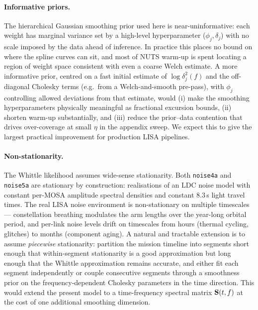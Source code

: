 \documentclass[%
	reprint,
	nofootinbib,
	amsmath,
	amssymb,
	aps,
]{revtex4-2}
\begin{document}
	\paragraph{Informative priors.}
	The hierarchical Gaussian smoothing prior used here is
	near-uninformative: each weight has marginal variance set by a
	high-level hyperparameter ($\phi_{j}, \delta_{j}$) with no scale
	imposed by the data ahead of inference. In practice this places no
	bound on where the spline curves can sit, and most of NUTS
	warm-up is spent locating a region of weight space consistent with
	even a coarse Welch estimate. A more informative prior, centred on
	a fast initial estimate of $\log\delta_{j}^{2}(f)$ and the
	off-diagonal Cholesky terms (e.g.\ from a Welch-and-smooth pre-pass),
	with $\phi_{j}$ controlling allowed deviations from that estimate,
	would (i) make the smoothing hyperparameters physically meaningful as
	fractional excursion bounds, (ii) shorten warm-up substantially, and
	(iii) reduce the prior--data contention that drives over-coverage at
	small $\eta$ in the appendix sweep. We expect this to give the largest
	practical improvement for production LISA pipelines.

	\paragraph{Non-stationarity.}
	The Whittle likelihood assumes wide-sense stationarity. Both
	\texttt{noise4a} and \texttt{noise5a} are stationary by
	construction: realisations of an LDC noise model with constant
	per-MOSA amplitude spectral densities and constant $8.3$\,s light
	travel times. The real LISA noise environment is non-stationary on
	multiple timescales --- constellation breathing modulates the arm
	lengths over the year-long orbital period, and per-link noise levels
	drift on timescales from hours (thermal cycling, glitches) to
	months (component aging). A natural and tractable extension is to
	assume \emph{piecewise} stationarity: partition the mission timeline
	into segments short enough that within-segment stationarity is a
	good approximation but long enough that the Whittle approximation
	remains accurate, and either fit each segment independently or
	couple consecutive segments through a smoothness prior on the
	frequency-dependent Cholesky parameters in the time direction. This
	would extend the present model to a time-frequency spectral matrix
	$\S(t,f)$ at the cost of one additional smoothing dimension.
\end{document}
